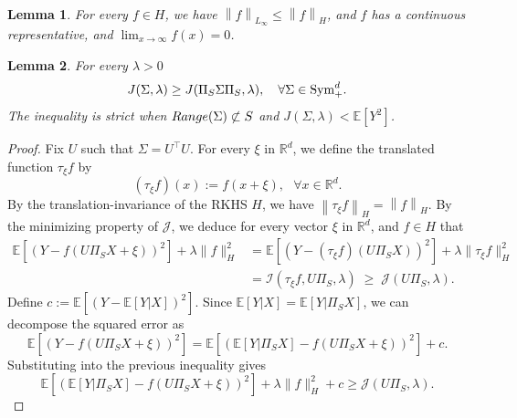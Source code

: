 \documentclass[10pt,a4paper]{amsart}
\newtheorem{lemma}{Lemma}
\newcommand{\E}{\mathbb{E}}
\newcommand{\R}{\mathbb{R}}
\newcommand{\Range}{{\rm Range}}
\newcommand{\Sym}{{\rm \mathrm{Sym}}}
\newcommand{\norm}[1]{\left\|{#1}\right\|} %
\begin{document}
\begin{lemma}
\label{lemma:continuous-embedding}
For every $f \in H$, we have $\norm{f}_{L_\infty} \le \norm{f}_H$, and $f$ has a continuous representative, and $\lim_{x \to \infty} f(x) = 0$.
\end{lemma} 

\begin{lemma}
\label{lemma:projection-reduce-function-value}
For every $\lambda > 0$
\begin{equation*}
	J(\Sigma, \lambda) \ge J(\Pi_S \Sigma \Pi_S, \lambda),~~~\forall \Sigma \in \Sym_+^d.
\end{equation*} 
The inequality is strict when $\Range(\Sigma) \not \subset S$ and $J(\Sigma, \lambda) < \E[Y^2]$.
\end{lemma} 

\begin{proof} 
Fix $U$ such that $\Sigma = U^\top U$. 
For every $\xi$ in $\R^d$, we define the translated function $\tau_\xi f$ by
\begin{equation*}
	(\tau_\xi f)(x):= f(x+\xi),~~~\forall x \in \R^d.
\end{equation*}
By the translation-invariance of the RKHS $H$, we have $\norm{\tau_\xi f}_H = \norm{f}_H$. 
By the minimizing property of $\mathcal{J}$, we deduce for every vector $\xi$ in $\R^d$, and $f \in H$ that 
\begin{equation*}
\begin{aligned}
  \E[(Y - f(U\Pi_S X + \xi))^2] + \lambda \|f\|_H^2
   &= \E[(Y - (\tau_\xi f)(U\Pi_S X))^2] + \lambda \|\tau_\xi f\|_H^2 \\
   &= \mathcal{I}(\tau_\xi f, U\Pi_S, \lambda)
   \;\ge\; \mathcal{J}(U\Pi_S, \lambda).
\end{aligned}
\end{equation*}
Define $c := \E[(Y - \E[Y|X])^2]$. Since $\E[Y|X] = \E[Y|\Pi_S X]$, we can decompose the squared error as
\[
\E[(Y - f(U \Pi_{S} X + \xi))^2] = \E\left[(\E[Y|\Pi_{S} X] - f(U \Pi_{S} X + \xi))^2\right] + c.
\]
Substituting into the previous inequality gives
\[
\E\left[(\E[Y|\Pi_{S} X] - f(U \Pi_{S} X + \xi))^2\right] + \lambda \|f\|_H^2 + c \ge \mathcal{J}(U\Pi_S, \lambda).
\]


\end{proof}
\end{document}
